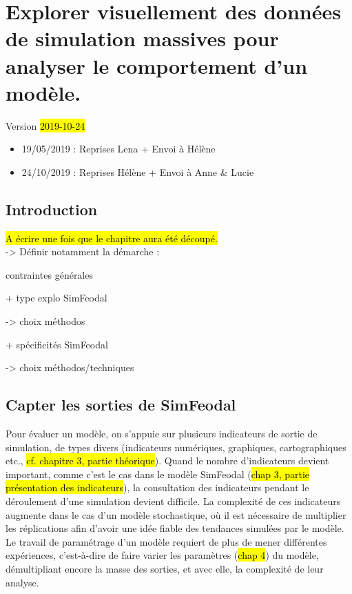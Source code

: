 \chapter{Explorer visuellement des données de simulation massives pour analyser le comportement d'un modèle.}
\label{chap:chap5}
\begin{center}
{\large Version \hl{2019-10-24}}
\end{center}
\begin{itemize}
	\item 19/05/2019 : Reprises Lena + Envoi à Hélène
	\item 24/10/2019 : Reprises Hélène + Envoi à Anne \& Lucie
\end{itemize} 
\setcounter{minitocdepth}{2}
\minitoc

\clearpage
\section*{Introduction}
\hl{A écrire une fois que le chapitre aura été découpé.}\\
-> Définir notamment la démarche :
\begin{compactitem}
	\item contraintes générales
	\item + type explo SimFeodal
	\item -> choix méthodos
	\item + spécificités SimFeodal
	\item -> choix méthodos/techniques
\end{compactitem}
		


\clearpage
\section[Capter les sorties de SimFeodal]{{Capter les sorties de SimFeodal}%
	}\label{sec:sorties-simfeodal}

Pour évaluer un modèle, on s'appuie sur plusieurs indicateurs de sortie de simulation, de types divers (indicateurs numériques, graphiques, cartographiques etc., \hl{cf. chapitre 3, partie théorique}).
Quand le nombre d'indicateurs devient important, comme c'est le cas dans le modèle SimFeodal (\hl{chap 3, partie présentation des indicateurs}), la consultation des indicateurs pendant le déroulement d'une simulation devient difficile.
La complexité de ces indicateurs augmente dans le cas d'un modèle stochastique, où il est nécessaire de multiplier les réplications afin d'avoir une idée fiable des tendances simulées par le modèle.
Le travail de paramétrage d'un modèle requiert de plus de mener différentes expériences, c'est-à-dire de faire varier les paramètres (\hl{chap 4}) du modèle, démultipliant encore la masse des sorties, et avec elle, la complexité de leur analyse.

